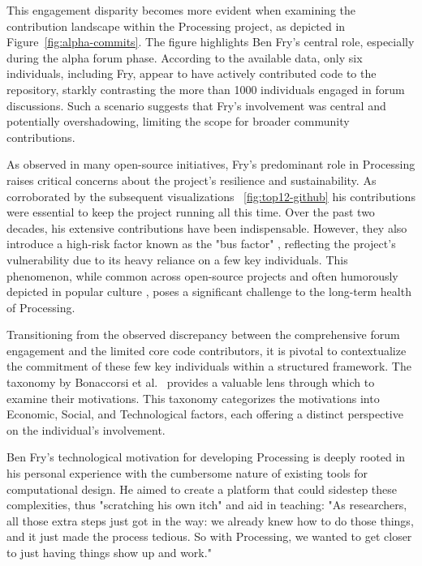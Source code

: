 This engagement disparity becomes more evident when examining the contribution landscape within the Processing project, as depicted in Figure~\ref{fig:alpha-commits}. The figure highlights Ben Fry's central role, especially during the alpha forum phase. According to the available data, only six individuals, including Fry, appear to have actively contributed code to the repository, starkly contrasting the more than 1000 individuals engaged in forum discussions. Such a scenario suggests that Fry's involvement was central and potentially overshadowing, limiting the scope for broader community contributions. 

As observed in many open-source initiatives, Fry's predominant role in Processing raises critical concerns about the project's resilience and sustainability. As corroborated by the subsequent visualizations ~\ref{fig:top12-github} his contributions were essential to keep the project running all this time. Over the past two decades, his extensive contributions have been indispensable. However, they also introduce a high-risk factor known as the "bus factor" \parencite{BusFactor2023}, reflecting the project's vulnerability due to its heavy reliance on a few key individuals. This phenomenon, while common across open-source projects and often humorously depicted in popular culture \parencite{munroeDependency2020}, poses a significant challenge to the long-term health of Processing.



Transitioning from the observed discrepancy between the comprehensive forum engagement and the limited core code contributors, it is pivotal to contextualize the commitment of these few key individuals within a structured framework. The taxonomy by Bonaccorsi et al.~\cite{bonaccorsiComparingMotivationsIndividual2006} provides a valuable lens through which to examine their motivations. This taxonomy categorizes the motivations into Economic, Social, and Technological factors, each offering a distinct perspective on the individual's involvement.

Ben Fry's technological motivation for developing Processing is deeply rooted in his personal experience with the cumbersome nature of existing tools for computational design. He aimed to create a platform that could sidestep these complexities, thus "scratching his own itch" and aid in teaching: "As researchers, all those extra steps just got in the way: we already knew how to do those things, and it just made the process tedious. So with Processing, we wanted to get closer to just having things show up and work." 

